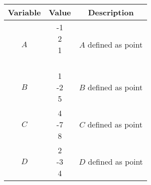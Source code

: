 \begin{tabular}{|c| c |  c |}
\hline
\textbf{Variable} & \textbf{Value} & \textbf{Description} \\
\hline
$A$ & \myvec{-1 \\ 2\\ 1\\ \\} & $A$ defined as point \\
\hline
$B$ & \myvec{1 \\ -2\\ 5\\}  & $B$ defined as point  \\
\hline
$C$ & \myvec{4 \\ -7\\ 8\\} & $C$ defined as point\\
\hline
$D$ & \myvec{2 \\ -3\\ 4\\} & $D$ defined as point \\
\hline
\end{tabular} 